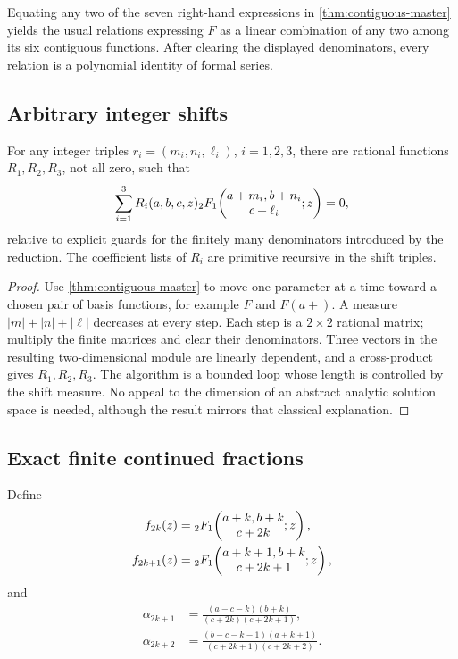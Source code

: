 \begin{corollary}
Equating any two of the seven right-hand expressions in
\cref{thm:contiguous-master} yields the usual relations expressing \(F\) as a
linear combination of any two among its six contiguous functions.  After
clearing the displayed denominators, every relation is a polynomial identity
of formal series.
\end{corollary}

\subsection{Arbitrary integer shifts}

\begin{theorem}\label{thm:shift-reduction}
For any integer triples \(r_i=(m_i,n_i,\ell_i)\), \(i=1,2,3\), there are
rational functions \(R_1,R_2,R_3\), not all zero, such that
\[
 \sum_{i=1}^3R_i(a,b,c,z)
 {}_2F_1\!\left(\begin{matrix}a+m_i,b+n_i\\c+\ell_i\end{matrix};z\right)=0,
\]
relative to explicit guards for the finitely many denominators introduced by
the reduction.  The coefficient lists of \(R_i\) are primitive recursive in
the shift triples.
\end{theorem}

\begin{proof}
Use \cref{thm:contiguous-master} to move one parameter at a time toward a
chosen pair of basis functions, for example \(F\) and \(F(a+)\).  A measure
\(|m|+|n|+|\ell|\) decreases at every step.  Each step is a \(2\times2\)
rational matrix; multiply the finite matrices and clear their denominators.
Three vectors in the resulting two-dimensional module are linearly dependent,
and a cross-product gives \(R_1,R_2,R_3\).  The algorithm is a bounded loop
whose length is controlled by the shift measure.  No appeal to the dimension
of an abstract analytic solution space is needed, although the result mirrors
that classical explanation.
\end{proof}

\subsection{Exact finite continued fractions}

Define
\begin{align*}
 f_{2k}(z)&={}_2F_1\!\left(\begin{matrix}a+k,b+k\\c+2k\end{matrix};z\right),\\
 f_{2k+1}(z)&={}_2F_1\!\left(\begin{matrix}a+k+1,b+k\\c+2k+1\end{matrix};z\right),
\end{align*}
and
\begin{align*}
 \alpha_{2k+1}
 &=\frac{(a-c-k)(b+k)}{(c+2k)(c+2k+1)},\\
 \alpha_{2k+2}
 &=\frac{(b-c-k-1)(a+k+1)}{(c+2k+1)(c+2k+2)}.
\end{align*}

